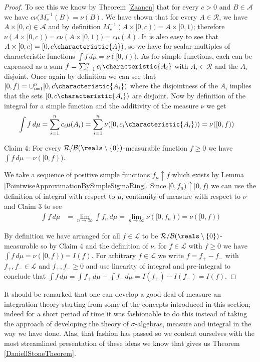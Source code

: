 \begin{proof}
To see this we know by Theorem \ref{Zaanen} that for every $c > 0$ and
$B \in \mathcal{A}$ we have $c \nu(M_c^{-1}(B) = \nu(B)$.  We have
shown that for every $A \in \mathcal{R}$, we have $A \times [0,c) \in
\mathcal{A}$ and by definition $M_c^{-1}(A \times [0,c)) = A \times
[0,1)$; therefore $\nu(A \times [0,c)) = c \nu(A \times [0,1)) = c
\mu(A)$. It is also easy to see that $A \times [0,c) = [0,
c\characteristic{A})$, so we have for scalar multiples of
characteristic functions $\int f \, d\mu = \nu([0,f))$.  As for simple
functions, each can be expressed as a sum $f = \sum_{i=1}^n c_i
\characteristic{A_i}$ with $A_i \in \mathcal{R}$ and the $A_i$
disjoint.  Once again by definition we can see that $[0,f) =
\cup_{i=1}^n [0, c \characteristic{A_i})$ where the disjointness of
the $A_i$ implies that the sets $ [0, c \characteristic{A_i})$ are
disjoint.  Now by definition of the integral for a simple function and
the additivity of the measure $\nu$ we get
\begin{align*}
\int f \, d \mu &= \sum_{i=1}^n c_i \mu(A_i) = \sum_{i=1}^n \nu([0,c_i
\characteristic{A_i})) = \nu([0,f))
\end{align*}

Claim 4: For every $\mathcal{R}/\mathcal{B}(\reals \setminus \lbrace 0
\rbrace)$-measurable function $f \geq 0$ we have $\int f \, d\mu =
\nu([0,f))$.

We take a sequence of positive simple functions $f_n \uparrow f$ which
exists by Lemma \ref{PointwiseApproximationBySimpleSigmaRing}.
Since $[0,f_n) \uparrow [0,f)$ we can use the definition of integral
with respect to $\mu$, continuity of measure with respect to $\nu$ and
Claim 3 to see
\begin{align*}
\int f \, d \mu &= \lim_{n \to \infty} \int f_n \, d\mu = \lim_{n \to
  \infty} \nu([0,f_n)) = \nu([0,f))
\end{align*}

By definition we have arranged for all $f \in
\mathcal{L}$ to be $\mathcal{R}/\mathcal{B}(\reals \setminus \lbrace 0
\rbrace)$-measurable so by Claim 4 and the definition of $\nu$, for $f
\in \mathcal{L}$ with $f \geq 0$ we have $\int f \, d \mu = \nu([0,f))
= I(f)$.  For arbitrary $f \in \mathcal{L}$ we write $f = f_+ - f_-$
with $f_+, f_- \in \mathcal{L}$ and $f_+, f_- \geq 0$ and use
linearity of integral and pre-integral to conclude that $\int f \, d
\mu = \int f_+ \, d\mu - \int f_- \, d\mu = I(f_+) - I(f_-) = I(f)$.
\end{proof}

It should be remarked that one can develop a good deal of measure an
integration theory starting from some of the concepts introduced in
this section; indeed for a short period of time it was fashionable to
do this instead of taking the approach of developing the theory of
$\sigma$-algebras, measure and integral in the way we have done.
Alas, that fashion has passed so we content ourselves with the most
streamlined presentation of these ideas we know that gives us Theorem \ref{DaniellStoneTheorem}.

